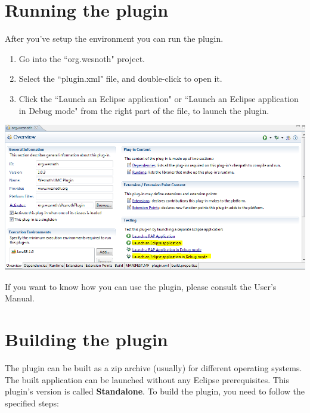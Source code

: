 \documentclass[10pt]{article}
\begin{document}
\section{Running the plugin}
After you've setup the environment you can run the plugin.
\begin{enumerate}
	\item Go into the ``org.wesnoth" project.
	\item Select the ``plugin.xml" file, and double-click to open it.
	\item Click the ``Launch an Eclipse application" or ``Launch an Eclipse application in Debug mode" from the right part of the file, to launch the plugin.
\end{enumerate}
\begin{center}
	\includegraphics[scale=0.7]{launch_plugin.png}
\end{center}

If you want to know how you can use the plugin, please consult the User's Manual.

\section{Building the plugin}
The plugin can be built as a zip archive (usually) for different operating systems. The built application can be launched without any Eclipse prerequisites. This plugin's version is called \textbf{Standalone}. To build the plugin, you need to follow the specified steps:
\end{document}

